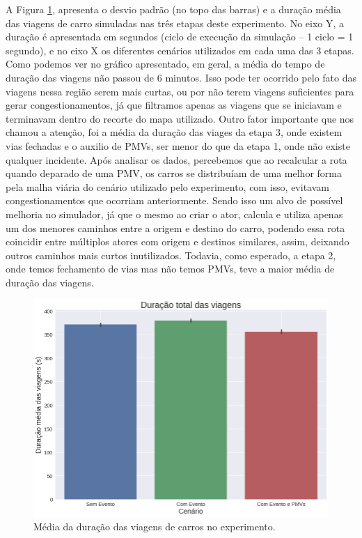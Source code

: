 A Figura \ref{fig:duracao_total}, apresenta o desvio padrão (no topo das barras) e a duração média das viagens de carro simuladas nas três etapas deste experimento.
No eixo Y, a duração é apresentada em segundos (ciclo de execução da simulação -- 1 ciclo = 1 segundo), e no eixo X os diferentes cenários utilizados em cada uma das 3 etapas.
Como podemos ver no gráfico apresentado, em geral, a média do tempo de duração das viagens não passou de 6 minutos.
Isso pode ter ocorrido pelo fato das viagens nessa região serem mais curtas, ou por não terem viagens suficientes para gerar congestionamentos, já que filtramos apenas as viagens que se iniciavam e
terminavam dentro do recorte do mapa utilizado.
Outro fator importante que nos chamou a atenção, foi a média da duração das viages da etapa 3, onde existem vias fechadas e o auxilio de PMVs, ser menor do que da etapa 1, onde não existe qualquer
incidente.
Após analisar os dados, percebemos que ao recalcular a rota quando deparado de uma PMV, os carros se distribuíam de uma melhor forma pela malha viária do cenário utilizado pelo experimento, com isso,
evitavam congestionamentos que ocorriam anteriormente.
Sendo isso um alvo de possível melhoria no simulador, já que o mesmo ao criar o ator, calcula e utiliza apenas um dos menores caminhos entre a origem e destino do carro, podendo essa rota coincidir entre
múltiplos atores com origem e destinos similares, assim, deixando outros caminhos mais curtos inutilizados.
Todavia, como esperado, a etapa 2, onde temos fechamento de vias mas não temos PMVs, teve a maior média de duração das viagens.

\begin{figure}[ht]
	\centering
	\includegraphics[width=.8\textwidth]{figuras/duracao_total.png}
	\caption{Média da duração das viagens de carros no experimento.}
	\label{fig:duracao_total}
\end{figure}

